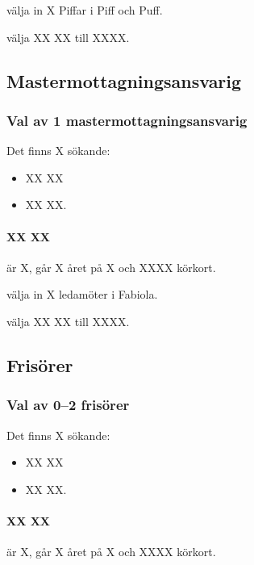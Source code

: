 \documentclass[hidelinks]{sektionsmote}
\begin{document}
\begin{beslut}
  \item välja in X Piffar i Piff och Puff.
\end{beslut}
\begin{beslut}
  \item välja XX XX till XXXX.
\end{beslut}


\subsection{Mastermottagningsansvarig}
\subsubsection{Val av 1 mastermottagningsansvarig}
Det finns X sökande:
\begin{itemize}
    \item XX XX
    \item XX XX.
\end{itemize}

\paragraph{XX XX} är X, går X året på X och XXXX körkort.

\begin{beslut}
  \item välja in X ledamöter i Fabiola.
\end{beslut}
\begin{beslut}
  \item välja XX XX till XXXX.
\end{beslut}


\subsection{Frisörer}
\subsubsection{Val av 0--2 frisörer}
Det finns X sökande:
\begin{itemize}
    \item XX XX
    \item XX XX.
\end{itemize}

\paragraph{XX XX} är X, går X året på X och XXXX körkort.
\end{document}
